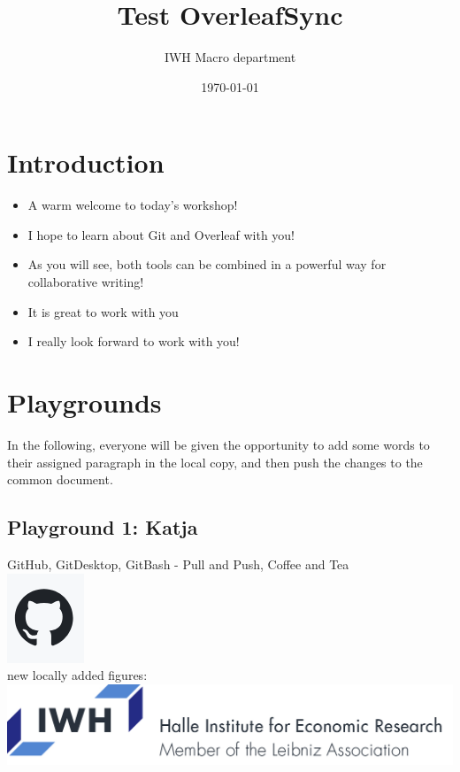 \documentclass{article}
\title{Test OverleafSync}
\author{IWH Macro department}
\date{\today}
\begin{document}
\maketitle

\section{Introduction}

\begin{itemize} 
    \item A warm welcome to today's workshop!
    \item I hope to learn about Git and Overleaf with you!
    \item As you will see, both tools can be combined in a powerful way for collaborative writing!
    \item It is great to work with you
    \item I really look forward to work with you!
\end{itemize}

\section{Playgrounds}
In the following, everyone will be given the opportunity to add some words to their assigned paragraph in the local copy, and then push the changes to the common document.

\subsection{Playground 1: Katja}
GitHub, GitDesktop, GitBash - Pull and Push, Coffee and Tea
\\
\includegraphics[Test Figure]{Figures/Overleaf.PNG}
\\

new locally added figures:
\includegraphics[Test Figure]{Figures/Logo_IWH_English.PNG}
\end{document}

